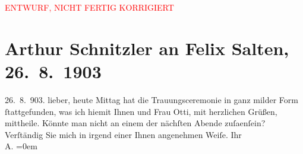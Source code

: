 
\begin{center}
            \textcolor{red}{ENTWURF, NICHT FERTIG KORRIGIERT}
                      \end{center}
            
         
         \renewcommand{\erwaehntePersonen}{Personen: Felix Salten, Ottilie Salten}
         \renewcommand{\erwaehnteOrte}{Orte: Wien}
         \renewcommand{\erwaehnteWerke}{}
               \section[Arthur Schnitzler an Felix Salten, 26. 8. 1903]{ Arthur Schnitzler an Felix Salten, 26. 8. 1903}\nopagebreak{}\rehead{ }\begin{ledgroupsized}[t]{13cm}\normalsize\beginnumbering \toendnotes[C]{\smallbreak\pagebreak[2]} 
\pstart
           \raggedleft{}{\pb}26. 8. 903.\pend
           \pstart
           lieber, heute Mittag hat die Trauungsceremonie in ganz milder Form
               ſtattgefunden, was ich hiemit Ihnen und Frau Otti, mit
               herzlichen Grüßen, mittheile. \pend
           \pstart
           {\pb}Könnte man nicht an einem der
               nächſten Abende zuſa{\geminationm}enſein? Verſtändig Sie mich in
               irgend einer Ihnen angenehmen Weiſe. \pend
           \pstart
           Ihr {\\[\baselineskip]}\spacefill\mbox{A.}\pend
           \leftskip=0em{}
         
         \endnumbering{}\end{ledgroupsized}\begin{anhang}\end{anhang}\newcommand{\dateiname}{L02983}\newcommand{\titel}{Arthur Schnitzler an Felix Salten, 26. 8. 1903}\newcommand{\editorInnen}{Martin Anton Müller und Laura Untner}
      